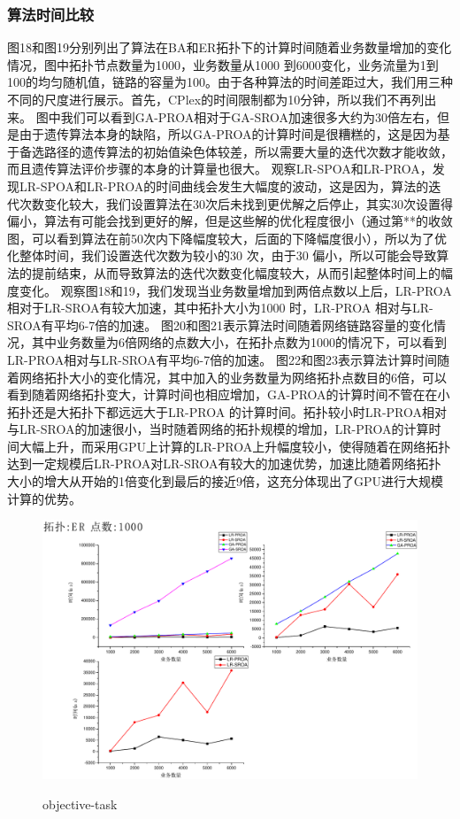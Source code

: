 \subsubsection{算法时间比较}
  图18和图19分别列出了算法在BA和ER拓扑下的计算时间随着业务数量增加的变化情况，图中拓扑节点数量为1000，业务数量从1000 到6000变化，业务流量为1到100的均匀随机值，链路的容量为100。由于各种算法的时间差距过大，我们用三种不同的尺度进行展示。首先，CPlex的时间限制都为10分钟，所以我们不再列出来。
  图中我们可以看到GA-PROA相对于GA-SROA加速很多大约为30倍左右，但是由于遗传算法本身的缺陷，所以GA-PROA的计算时间是很糟糕的，这是因为基于备选路径的遗传算法的初始值染色体较差，所以需要大量的迭代次数才能收敛，而且遗传算法评价步骤的本身的计算量也很大。
  观察LR-SPOA和LR-PROA，发现LR-SPOA和LR-PROA的时间曲线会发生大幅度的波动，这是因为，算法的迭代次数变化较大，我们设置算法在30次后未找到更优解之后停止，其实30次设置得偏小，算法有可能会找到更好的解，但是这些解的优化程度很小（通过第**的收敛图，可以看到算法在前50次内下降幅度较大，后面的下降幅度很小），所以为了优化整体时间，我们设置迭代次数为较小的30 次，由于30 偏小，所以可能会导致算法的提前结束，从而导致算法的迭代次数变化幅度较大，从而引起整体时间上的幅度变化。
  观察图18和19，我们发现当业务数量增加到两倍点数以上后，LR-PROA相对于LR-SROA有较大加速，其中拓扑大小为1000 时，LR-PROA 相对与LR-SROA有平均6-7倍的加速。
  图20和图21表示算法时间随着网络链路容量的变化情况，其中业务数量为6倍网络的点数大小，在拓扑点数为1000的情况下，可以看到LR-PROA相对与LR-SROA有平均6-7倍的加速。
  图22和图23表示算法计算时间随着网络拓扑大小的变化情况，其中加入的业务数量为网络拓扑点数目的6倍，可以看到随着网络拓扑变大，计算时间也相应增加，GA-PROA的计算时间不管在在小拓扑还是大拓扑下都远远大于LR-PROA 的计算时间。拓扑较小时LR-PROA相对与LR-SROA的加速很小，当时随着网络的拓扑规模的增加，LR-PROA的计算时间大幅上升，而采用GPU上计算的LR-PROA上升幅度较小，使得随着在网络拓扑达到一定规模后LR-PROA对LR-SROA有较大的加速优势，加速比随着网络拓扑大小的增大从开始的1倍变化到最后的接近9倍，这充分体现出了GPU进行大规模计算的优势。
\begin{figure}
\setlength{\belowcaptionskip}{-0.1cm}
  \begin{center}
    {\includegraphics[width=1 \textwidth]{figures/TI-ER-TA-1000.pdf}}
    \end{center}
  \caption{{\footnotesize{objective-task}}}
  \label{IterNum}
\end{figure}
